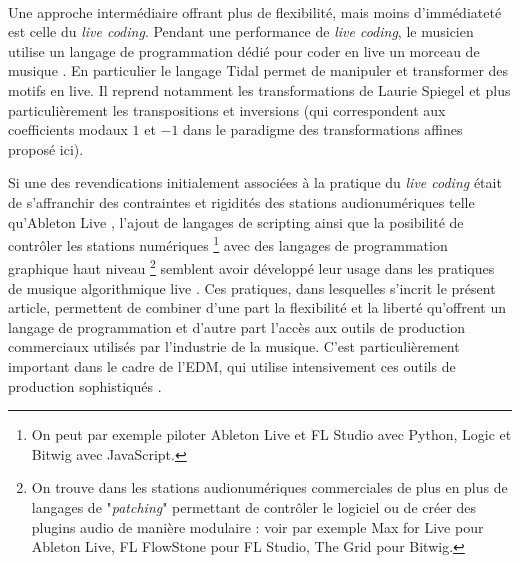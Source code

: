 \paragraph*{}

Une approche intermédiaire offrant plus de flexibilité, mais moins d'immédiateté est celle du \emph{live coding}. Pendant une performance de \emph{live coding}, le musicien utilise un langage de programmation dédié pour coder en live un morceau de musique \cite{blackwell2022live}. En particulier le langage Tidal \cite{mclean2010tidal} permet de manipuler et transformer des motifs en live. Il reprend notamment les transformations de Laurie Spiegel \cite{spiegel1981manipulations} et plus particulièrement les transpositions et inversions (qui correspondent aux coefficients modaux $1$ et $-1$ dans le paradigme des transformations affines proposé ici).

Si une des revendications initialement associées à la pratique du \emph{live coding} était de s'affranchir des contraintes et rigidités des stations audionumériques telle qu'Ableton Live \cite{collins2003live}, l'ajout de langages de scripting  ainsi que la posibilité de contrôler les stations numériques \footnote{On peut par exemple piloter  Ableton Live et FL Studio avec Python, Logic et Bitwig avec JavaScript.} avec des langages de programmation graphique haut niveau \footnote{On trouve dans les stations audionumériques commerciales de plus en plus de langages de "\emph{patching}" permettant de contrôler le logiciel ou de créer des plugins audio de manière modulaire : voir par exemple Max for Live pour Ableton Live, FL FlowStone pour FL Studio, The Grid pour Bitwig.} semblent avoir développé leur usage dans les pratiques de musique algorithmique live \cite{collins2014algorave}. Ces pratiques, dans lesquelles s'incrit le présent article, permettent de combiner d'une part la flexibilité et la liberté qu'offrent un langage de programmation et d'autre part l'accès aux outils de production commerciaux utilisés par l'industrie de la musique. C'est particulièrement important dans le cadre de l'EDM, qui utilise intensivement ces outils de production sophistiqués \cite{fraser2012spaces}.

